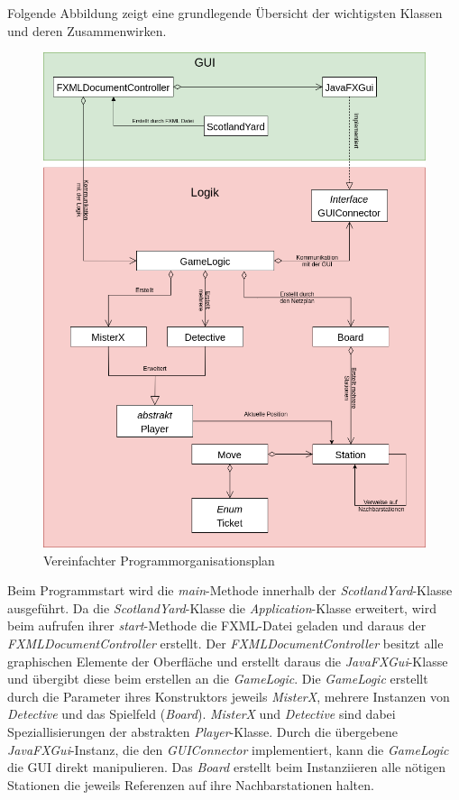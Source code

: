 
Folgende Abbildung zeigt eine grundlegende Übersicht der wichtigsten Klassen und deren Zusammenwirken.
\begin{center}
    \begin{figure}[H]
        \centering
        \includegraphics[scale=0.35]{img/uml/pop.png}   
        \caption{Vereinfachter Programmorganisationsplan}
    \end{figure}
\end{center}
Beim Programmstart wird die \textit{main}-Methode innerhalb der \textit{ScotlandYard}-Klasse ausgeführt.
Da die \textit{ScotlandYard}-Klasse die \textit{Application}-Klasse erweitert, wird beim aufrufen ihrer \textit{start}-Methode
die FXML-Datei geladen und daraus der \textit{FXMLDocumentController} erstellt.
Der \textit{FXMLDocumentController} besitzt alle graphischen Elemente der Oberfläche und erstellt daraus die \textit{JavaFXGui}-Klasse
und übergibt diese beim erstellen an die \textit{GameLogic}.
\newline
\newline
Die \textit{GameLogic} erstellt durch die Parameter ihres Konstruktors jeweils \textit{MisterX}, mehrere Instanzen von \textit{Detective}
und das Spielfeld (\textit{Board}). \textit{MisterX} und \textit{Detective} sind dabei Speziallisierungen der abstrakten \textit{Player}-Klasse.
Durch die übergebene \textit{JavaFXGui}-Instanz, die den \textit{GUIConnector} implementiert, kann die \textit{GameLogic} die GUI direkt manipulieren.
\newline
\newline
Das \textit{Board} erstellt beim Instanziieren alle nötigen Stationen die jeweils Referenzen auf ihre Nachbarstationen halten.